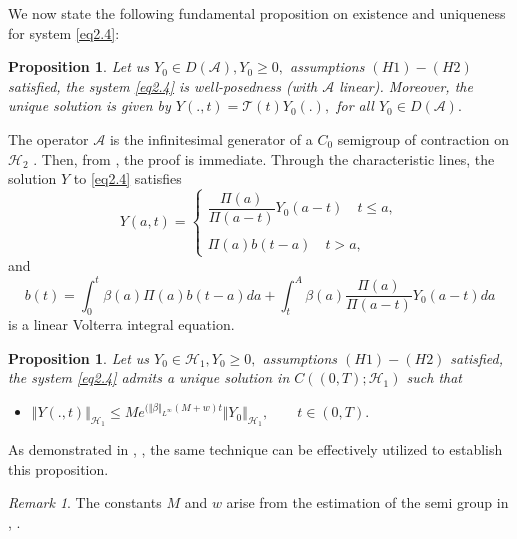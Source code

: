 \documentclass[10pt, a4paper]{amsart}
\makeatletter
\newcounter{assu}
\theoremstyle{plain}
\newtheorem{proposition}[lemma]{Proposition}
\theoremstyle{definition}
\theoremstyle{remark}
\newtheorem{remark}[lemma]{Remark}
\renewenvironment{proof}[1][\proofname]{\par
  \pushQED{\qed}%
  \normalfont \topsep6\p@\@plus6\p@\relax
  \trivlist
  \item[\hskip\labelsep
        \itshape
    #1\ \ref{#1}.]\ignorespaces
}{%
  \popQED\endtrivlist\@endpefalse
}
\numberwithin{equation}{section}
\makeatother
\begin{document}
 We now state the following fundamental proposition on existence and uniqueness for system \eqref{eq2.4}:
\begin{proposition}\label{pr2.2}
Let us $Y_0\in D(\mathcal{A}), Y_0\geq 0,$ assumptions  $(H1)-(H2)$ satisfied, the system \eqref{eq2.4} is well-posedness (with $\mathcal{A}$ linear). Moreover, the unique solution  is given by $Y(.,t)=\mathcal{T}(t)Y_0(.),$ for all $Y_0\in D(\mathcal{A}).$
\end{proposition}
\begin{proof}[of Proposition \ref{pr2.2}]
   The operator $\mathcal{A}$ is the infinitesimal generator of a $C_0$ semigroup of contraction on $\mathcal{H}_2$ \cite{ref28}. Then, from \cite[Theorem I]{ref32}, \cite{ref33} the proof is immediate.
\end{proof}
 Through the characteristic lines, the solution $Y$ to \eqref{eq2.4} satisfies
 \begin{equation}\label{eq2.6}
Y(a,t)=\left\lbrace
\begin{array}{ll}
\dfrac{\Pi(a)}{\Pi(a-t)}Y_{0}(a-t)\quad t\leq a,\\
\\\Pi(a)b(t-a)\quad t> a,
\end{array}
\right.
\end{equation}
and
 \begin{equation}\label{eq2.7}
b(t)=\displaystyle\int_0^t\beta(a)\Pi(a)b(t-a)da+\displaystyle\int_t^A\beta(a)\dfrac{\Pi(a)}{\Pi(a-t)}Y_{0}(a-t)da
\end{equation}
is a linear Volterra integral equation.
\begin{proposition}\label{pr2.3}
    Let us $Y_0\in \mathcal{H}_1, Y_0\geq 0,$ assumptions $(H1)-(H2)$ satisfied, the system \eqref{eq2.4} admits a unique solution in $C((0,T) ;\mathcal{H}_1)$ such that
    \begin{itemize}
        \item $\Vert Y(.,t)\Vert_{\mathcal{H}_1}\leq Me^{(\Vert\beta\Vert_{L^\infty}(M+w)t}\Vert Y_0\Vert_{\mathcal{H}_1},\qquad t \in (0,T).$
    \end{itemize}
 \end{proposition}
 \begin{proof}[of Proposition \ref{pr2.3}]
  As demonstrated in \cite[Theorem 4]{ref48},  \cite[Theorem 4.3]{ref31}, the same technique can be effectively utilized to establish this proposition.
 \end{proof}
 \begin{remark}
     The constants \(M\) and \(w\) arise from the estimation of the semi group in \cite[Lemma p.19]{ref33}, \cite[Lemma B]{ref28}.
 \end{remark}
\end{document}
